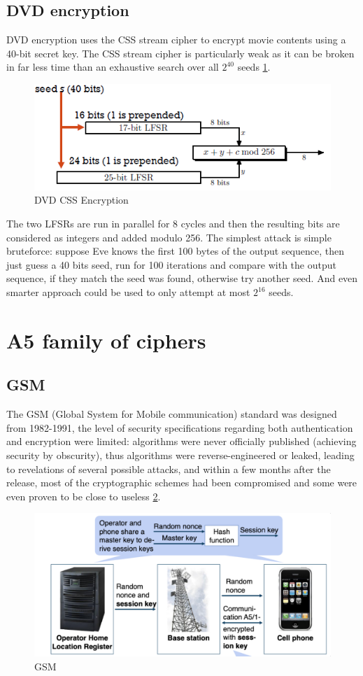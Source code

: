\subsection{DVD encryption}
DVD encryption uses the CSS stream cipher to encrypt movie contents using a 40-bit secret key. The CSS stream cipher is particularly weak as it can be broken in far less time than an exhaustive search over all $2^{40}$ seeds \ref{fig:DVD}.

\begin{figure}
	\centering
	\includegraphics[width=0.7\linewidth]{Images/Chapter2/DVD}
	\caption{DVD CSS Encryption}
	\label{fig:DVD}
\end{figure}

The two LFSRs are run in parallel for 8 cycles and then the resulting bits are considered as integers and added modulo 256.
The simplest attack is simple bruteforce: suppose Eve knows the first 100 bytes of the output sequence, then just guess a 40 bits seed, run for 100 iterations and compare with the output sequence, if they match the seed was found, otherwise try another seed. And even smarter approach could be used to only attempt at most $2^{16}$ seeds.

\section{A5 family of ciphers}

\subsection{GSM}
The GSM (Global System for Mobile communication) standard was designed from 1982-1991, the level of security specifications regarding both authentication and encryption were limited: algorithms were never officially published (achieving security by obscurity), thus algorithms were reverse-engineered or leaked, leading to revelations of several possible attacks, and within a few months after the release, most of the cryptographic schemes had been compromised and some were even proven to be close to useless \ref{fig:GSM}.

\begin{figure}
	\centering
	\includegraphics[width=0.7\linewidth]{Images/Chapter2/GSM}
	\caption{GSM}
	\label{fig:GSM}
\end{figure}

